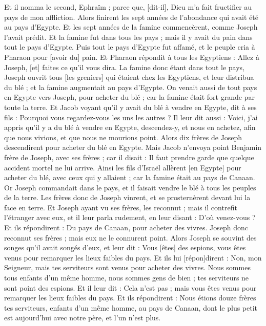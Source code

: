 \begin{multicols}{2}
Et il nomma le second, Ephraïm ; parce que, [dit-il], Dieu m'a fait fructifier au pays de mon affliction.
Alors finirent les sept années de l'abondance qui avait été au pays d'Egypte.
Et les sept années de la famine commencèrent, comme Joseph l'avait prédit. Et la famine fut dans tous les pays ; mais il y avait du pain dans tout le pays d'Egypte.
Puis tout le pays d'Egypte fut affamé, et le peuple cria à Pharaon pour [avoir du] pain. Et Pharaon répondit à tous les Egyptiens : Allez à Joseph, [et] faites ce qu'il vous dira.
La famine donc étant dans tout le pays, Joseph ouvrit tous [les greniers] qui étaient chez les Egyptiens, et leur distribua du blé ; et la famine augmentait au pays d'Egypte.
On venait aussi de tout pays en Egypte vers Joseph, pour acheter du blé ; car la famine était fort grande par toute la terre.
\VerseOne{}Et Jacob voyant qu'il y avait du blé à vendre en Egypte, dit à ses fils : Pourquoi vous regardez-vous les uns les autres ?
Il leur dit aussi : Voici, j'ai appris qu'il y a du blé à vendre en Egypte, descendez-y, et nous en achetez, afin que nous vivions, et que nous ne mourions point.
Alors dix frères de Joseph descendirent pour acheter du blé en Egypte.
Mais Jacob n'envoya point Benjamin frère de Joseph, avec ses frères ; car il disait : Il faut prendre garde que quelque accident mortel ne lui arrive.
Ainsi les fils d'Israël allèrent [en Egypte] pour acheter du blé, avec ceux qui y allaient ; car la famine était au pays de Canaan.
Or Joseph commandait dans le pays, et il faisait vendre le blé à tous les peuples de la terre. Les frères donc de Joseph vinrent, et se prosternèrent devant lui la face en terre.
Et Joseph ayant vu ses frères, les reconnut ; mais il contrefit l'étranger avec eux, et il leur parla rudement, en leur disant : D'où venez-vous ? Et ils répondirent : Du pays de Canaan, pour acheter des vivres.
Joseph donc reconnut ses frères ; mais eux ne le connurent point.
Alors Joseph se souvint des songes qu'il avait songés d'eux, et leur dit : Vous [êtes] des espions, vous êtes venus pour remarquer les lieux faibles du pays.
Et ils lui [répon]dirent : Non, mon Seigneur, mais tes serviteurs sont venus pour acheter des vivres.
Nous sommes tous enfants d'un même homme, nous sommes gens de bien ; tes serviteurs ne sont point des espions.
Et il leur dit : Cela n'est pas ; mais vous êtes venus pour remarquer les lieux faibles du pays.
Et ils répondirent : Nous étions douze frères tes serviteurs, enfants d'un même homme, au pays de Canaan, dont le plus petit est aujourd'hui avec notre père, et l'un n'est plus.

\end{multicols}
